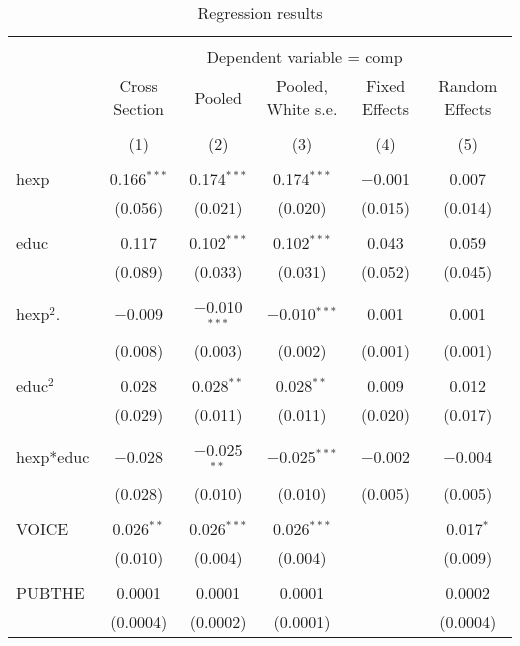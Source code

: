 \documentclass[12pt,a4paper]{article}\usepackage[]{graphicx}\usepackage[]{color}
\begin{document}
\begin{table}[!htbp] \centering 
  \caption{Regression results} 
  \label{tab:big} 
\scriptsize 
\begin{tabular}{@{\extracolsep{5pt}}lccccc} 
\\[-1.8ex]\hline 
\hline \\[-1.8ex] 
 & \multicolumn{5}{c}{Dependent variable = comp} \\ 
\cline{2-6} 
 & Cross Section & Pooled & Pooled, White s.e. & Fixed Effects & Random Effects \\ 
\\[-1.8ex] & (1) & (2) & (3) & (4) & (5)\\ 
\hline \\[-1.8ex] 
 hexp & 0.166$^{***}$ & 0.174$^{***}$ & 0.174$^{***}$ & $-$0.001 & 0.007 \\ 
  & (0.056) & (0.021) & (0.020) & (0.015) & (0.014) \\ 
  & & & & & \\ 
 educ & 0.117 & 0.102$^{***}$ & 0.102$^{***}$ & 0.043 & 0.059 \\ 
  & (0.089) & (0.033) & (0.031) & (0.052) & (0.045) \\ 
  & & & & & \\ 
 hexp$^2$. & $-$0.009 & $-$0.010$^{***}$ & $-$0.010$^{***}$ & 0.001 & 0.001 \\ 
  & (0.008) & (0.003) & (0.002) & (0.001) & (0.001) \\ 
  & & & & & \\ 
 educ$^2$ & 0.028 & 0.028$^{**}$ & 0.028$^{**}$ & 0.009 & 0.012 \\ 
  & (0.029) & (0.011) & (0.011) & (0.020) & (0.017) \\ 
  & & & & & \\ 
 hexp*educ & $-$0.028 & $-$0.025$^{**}$ & $-$0.025$^{***}$ & $-$0.002 & $-$0.004 \\ 
  & (0.028) & (0.010) & (0.010) & (0.005) & (0.005) \\ 
  & & & & & \\ 
 VOICE & 0.026$^{**}$ & 0.026$^{***}$ & 0.026$^{***}$ &  & 0.017$^{*}$ \\ 
  & (0.010) & (0.004) & (0.004) &  & (0.009) \\ 
  & & & & & \\ 
 PUBTHE & 0.0001 & 0.0001 & 0.0001 &  & 0.0002 \\ 
  & (0.0004) & (0.0002) & (0.0001) &  & (0.0004) \\ 

\end{tabular}
\end{table}
\end{document}
